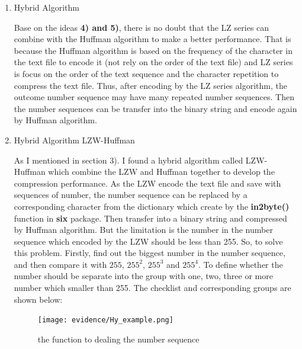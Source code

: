 \documentclass[margin 2cm]{report}
\begin{document}
\begin{enumerate}
\normalsize\item[4)]{Hybrid Algorithm}
\begin{spacing}{1.5}
\normalsize\indent\setlength{\parindent}{2em}Base on the ideas \textbf{4) and 5)}, there is no doubt that the LZ series can combine with the Huffman algorithm to make a better performance. That is because the Huffman algorithm is based on the frequency of the character in the text file to encode it (not rely on the order of the text file) and LZ series is focus on the order of the text sequence and the character repetition to compress the text file. Thus, after encoding by the LZ series algorithm, the outcome number sequence may have many repeated number sequences. Then the number sequences can be transfer into the binary string and encode again by Huffman algorithm.
\end{spacing}

\normalsize\item[5)]{Hybrid Algorithm LZW-Huffman}
\begin{spacing}{1.5}
\normalsize\indent\setlength{\parindent}{2em}As I mentioned in section 3). I found a hybrid algorithm called LZW-Huffman which combine the LZW and Huffman together to develop the compression performance. As the LZW encode the text file and save with sequences of number, the number sequence can be replaced by a corresponding character from the dictionary which create by the \textbf{in2byte()} function in \textbf{six} package. Then transfer into a binary string and compressed by Huffman algorithm. But the limitation is the number in the number sequence which encoded by the LZW should be less than 255. So, to solve this problem. Firstly, find out the biggest number in the number sequence, and then compare it with $255$, $255^{2}$, $255^{3}$  and  $255^{4}$. To define whether the number should be separate into the group with one, two, three or more number which smaller than 255. The checklist and corresponding groups are shown below:
\end{spacing}

\begin{figure}[H]
\centering
\label{Fig.sub.1}\texttt{[image: evidence/Hy\_example.png]}
\caption{the function to dealing the number sequence}
\label{Fig.main}
\end{figure}


\end{enumerate}
\end{document}
